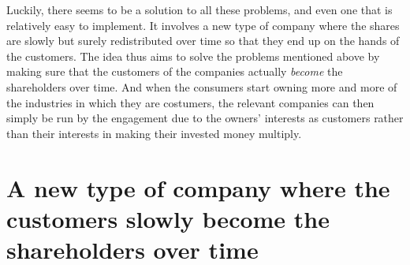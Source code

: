 \documentclass{article}
\begin{document}
%


Luckily, there seems to be a solution to all these problems, and even one that is relatively easy to implement. 
It involves a new type of company where the shares are slowly but surely redistributed over time so that they end up on the hands of the customers. 
The idea thus aims to solve the problems mentioned above 
by making sure that the customers of the companies actually \emph{become} the shareholders over time. %
And when the consumers start owning more and more of the industries in which they are costumers, the relevant companies can then simply be run by the engagement due to the owners' interests as customers rather than their interests in making their invested money multiply. 







\section[A new type of company]{A new type of company where the customers slowly become the shareholders over time}
\end{document}
